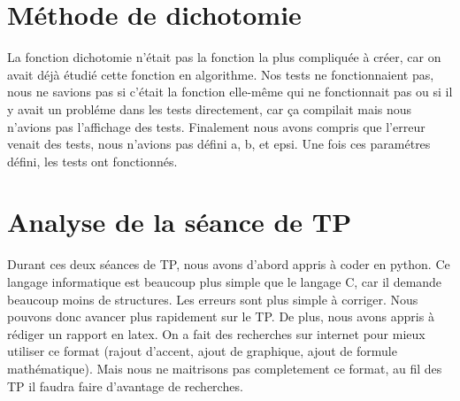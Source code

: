 \documentclass{article}
\begin{document}
\section{Méthode de dichotomie}

La fonction dichotomie n'était pas la fonction la plus compliquée à créer, car on avait déjà étudié cette fonction en algorithme.
Nos tests ne fonctionnaient pas, nous ne savions pas si c'était la fonction elle-même qui ne fonctionnait pas ou si il y avait un probléme dans les tests directement, car ça compilait mais nous n'avions pas l'affichage des tests. Finalement nous avons compris que l'erreur venait des tests, nous n'avions pas défini a, b, et epsi. Une fois ces paramétres défini, les tests ont fonctionnés.
$$ $$ 
\section{Analyse de la séance de TP}

Durant ces deux séances de TP, nous avons d'abord appris à coder en python. Ce langage informatique est beaucoup plus simple que le langage C, car il demande beaucoup moins de structures. Les erreurs sont plus simple à corriger. Nous pouvons donc avancer plus rapidement sur le TP.
De plus, nous avons appris à rédiger un rapport en latex. On a fait des recherches sur internet pour mieux utiliser ce format (rajout d'accent, ajout de graphique, ajout de formule mathématique). Mais nous ne maitrisons pas completement ce format, au fil des TP il faudra faire d'avantage de recherches.
\end{document}
